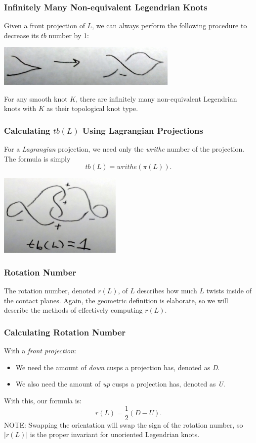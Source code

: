 \documentclass{beamer}
\begin{document}
\begin{frame}
    \frametitle{Infinitely Many Non-equivalent Legendrian Knots}
    Given a front projection of $L$, we can always perform the following
    procedure to decrease its $tb$ number by 1:
    \begin{center}
    \includegraphics[height=2cm]{infKnots.jpg}
    \end{center}
    \begin{theorem}
    For any smooth knot $K$, there are infinitely many non-equivalent
    Legendrian knots with $K$ as their topological knot type.
    \end{theorem}
\end{frame}

\begin{frame}
    \frametitle{Calculating $tb(L)$ Using Lagrangian Projections}
    For a \textit{Lagrangian} projection, we need only the \textit{writhe}
    number of the projection. \\
    The formula is simply
    \[tb(L) = writhe(\pi(L)).\]
    \begin{center}
    \includegraphics[height=4cm]{tbLagr.jpg}
    \end{center}
\end{frame}


\begin{frame}
    \frametitle{Rotation Number}
    The \alert{rotation number}, denoted \alert{$r(L)$}, of $L$ describes how
    much $L$ twists inside of the contact planes.
    Again, the geometric definition is elaborate, so we will describe the
    methods of effectively computing $r(L)$.
\end{frame}


\begin{frame}
    \frametitle{Calculating Rotation Number}
    With a \textit{front projection}:
    \begin{itemize}
        \item{We need the amount of \textit{down} cusps a projection has, denoted
        as \textit{D}.}
      \item{We also need the amount of \textit{up} cusps a projection has,
      denoted as \textit{U}.}
    \end{itemize}
    With this, our formula is:
    \[r(L) = \frac{1}{2}(D - U).\]
    \alert{NOTE}: Swapping the orientation will swap the sign of the rotation number,
    so $|r(L)|$ is the proper invariant for unoriented Legendrian knots.
\end{frame}
\end{document}
